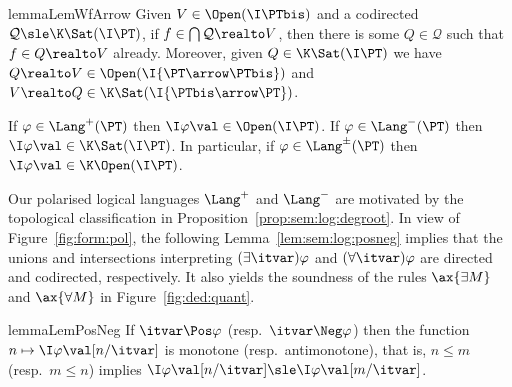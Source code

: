 \begin{restatable}{lemma}{LemWfArrow}
\label{lem:sem:log:realto}
Given $V \in \Open(\I\PTbis)$
and a codirected $\mathcal{Q} \sle \K\Sat(\I\PT)$,
if $f \in \bigcap\mathcal{Q} \realto V$,
then there is some $Q \in \mathcal{Q}$
such that $f \in Q \realto V$ already.
%
Moreover, given $Q \in \K\Sat(\I\PT)$ we have
$Q \realto V \in \Open(\I{\PT \arrow \PTbis})$
and
$V \realto Q \in \K\Sat(\I{\PTbis \arrow \PT})$.
\end{restatable}

\begin{proposition}[restate = PropFormdeGroot, name = ]
\label{prop:sem:log:degroot}
If $\varphi \in \Lang^+(\PT)$
then
$\I\varphi\val \in \Open(\I\PT)$.
If $\varphi \in \Lang^-(\PT)$
then
$\I\varphi\val \in \K\Sat(\I\PT)$.
In particular,
if $\varphi \in \Lang^\pm(\PT)$
then
$\I\varphi\val \in \K\Open(\I\PT)$.
\end{proposition}


Our polarised logical languages $\Lang^+$ and $\Lang^-$
are motivated by the topological classification in
Proposition~\ref{prop:sem:log:degroot}.
%
In view of Figure~\ref{fig:form:pol},
the following Lemma~\ref{lem:sem:log:posneg} implies
that the unions and intersections interpreting
$(\exists \itvar)\varphi$ and $(\forall \itvar)\varphi$
are directed and codirected, respectively.
It also yields the soundness of the 
rules $\ax{\exists M}$ and $\ax{\forall M}$
in Figure~\ref{fig:ded:quant}.

\begin{restatable}{lemma}{LemPosNeg}
\label{lem:sem:log:posneg}
If $\itvar \Pos \varphi$
(resp.\ $\itvar \Neg \varphi$)
then the function
$n \mapsto \I\varphi\val[n/\itvar]$
is monotone (resp.\ antimonotone),
that is, $n \leq m$ (resp.\ $m \leq n$)
implies
$\I\varphi\val[n / \itvar] \sle \I\varphi\val[m / \itvar]$.
\end{restatable}

